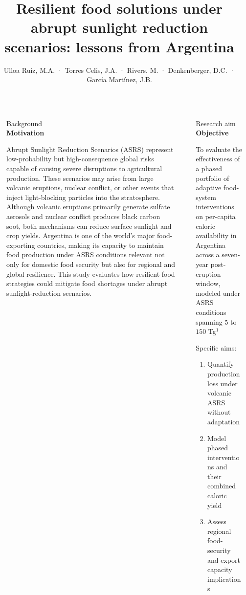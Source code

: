 \documentclass[final]{beamer}
\title{Resilient food solutions under abrupt sunlight reduction scenarios: lessons from Argentina}
\author{Ulloa Ruiz, M.A. · Torres Celis, J.A. · Rivers, M. · Denkenberger, D.C. · García Martínez, J.B.}
\institute[shortinst]{Observatorio de Riesgos Catastróficos Globales (ORCG) · ALLFED · University of Canterbury}
\newlength{\sepwidth}
\newlength{\colwidth}
\newenvironment{labelblock}[2]{%
  \begin{block}{%
      {\small\color{structure.fg!70!bg}#1}%
      \\[2pt]                                  %
      {\large\bfseries#2}%
      }%
      }{%
  \end{block}%
  }
\newcommand{\separatorcolumn}{\begin{column}{\sepwidth}\end{column}}
\begin{document}
\begin{frame}[t]
  \begin{columns}[t]
    \separatorcolumn

    \begin{column}{\colwidth}
      \begin{labelblock}{Background}{Motivation}
        Abrupt Sunlight Reduction Scenarios (ASRS) represent low-probability but high-consequence global risks capable of causing severe disruptions to agricultural production. These scenarios may arise from large volcanic eruptions, nuclear conflict, or other events that inject light-blocking particles into the stratosphere. Although volcanic eruptions primarily generate sulfate aerosols and nuclear conflict produces black carbon soot, both mechanisms can reduce surface sunlight and crop yields. Argentina is one of the world's major food-exporting countries, making its capacity to maintain food production under ASRS conditions relevant not only for domestic food security but also for regional and global resilience. This study evaluates how resilient food strategies could mitigate food shortages under abrupt sunlight-reduction scenarios.
      \end{labelblock}
    \end{column}

    \separatorcolumn

    \begin{column}{\colwidth}
      \begin{labelblock}{Research aim}{Objective}
        To evaluate the effectiveness of a phased portfolio of adaptive food-system interventions on per-capita caloric availability in Argentina across a seven-year post-eruption window, modeled under ASRS conditions spanning $5$ to $150$ Tg$^{1}$

        Specific aims:
        \begin{enumerate}
          \item Quantify production loss under volcanic ASRS without adaptation
          \item Model phased interventions and their combined caloric yield
          \item Assess regional food-security and export capacity implications
        \end{enumerate}
      \end{labelblock}
    \end{column}


\end{columns}
\end{frame}
\end{document}
